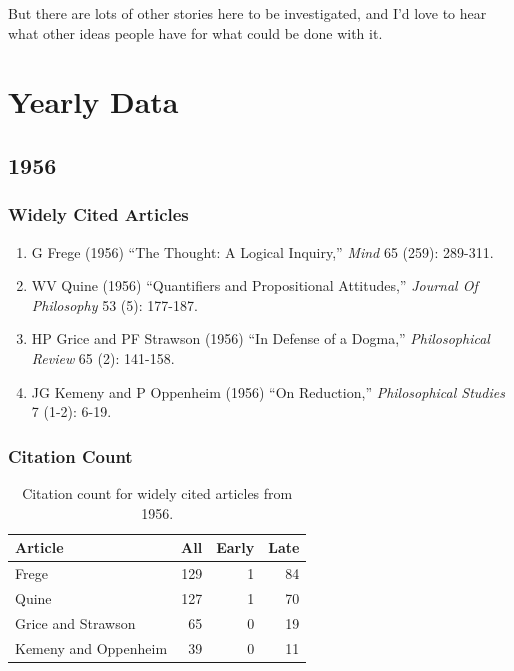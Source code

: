 \documentclass[
  10pt,
  letterpaper,
  DIV=11,
  numbers=noendperiod,
  twoside]{scrartcl}
\providecommand{\tightlist}{%
  \setlength{\itemsep}{0pt}\setlength{\parskip}{0pt}}\usepackage{longtable,booktabs,array}
\begin{document}
But there are lots of other stories here to be investigated, and I'd
love to hear what other ideas people have for what could be done with
it.

\section{Yearly Data}\label{yearly-data}

\subsection{1956}\label{sec-s1956}

\subsubsection*{Widely Cited Articles}\label{widely-cited-articles}

\begin{enumerate}
\def\labelenumi{\arabic{enumi}.}
\tightlist
\item
  G Frege (1956) ``The Thought: A Logical Inquiry,'' \emph{Mind} 65
  (259): 289-311.
\item
  WV Quine (1956) ``Quantifiers and Propositional Attitudes,''
  \emph{Journal Of Philosophy} 53 (5): 177-187.
\item
  HP Grice and PF Strawson (1956) ``In Defense of a Dogma,''
  \emph{Philosophical Review} 65 (2): 141-158.
\item
  JG Kemeny and P Oppenheim (1956) ``On Reduction,'' \emph{Philosophical
  Studies} 7 (1-2): 6-19.
\end{enumerate}

\subsubsection*{Citation Count}\label{sec-count-1956}

\begin{longtable}[]{@{}lrrr@{}}

\caption{\label{tbl-citation-count-1956}Citation count for widely cited
articles from 1956.}

\tabularnewline

\toprule\noalign{}
Article & All & Early & Late \\
\midrule\noalign{}
\endhead
\bottomrule\noalign{}
\endlastfoot
Frege & 129 & 1 & 84 \\
Quine & 127 & 1 & 70 \\
Grice and Strawson & 65 & 0 & 19 \\
Kemeny and Oppenheim & 39 & 0 & 11 \\

\end{longtable}
\end{document}
